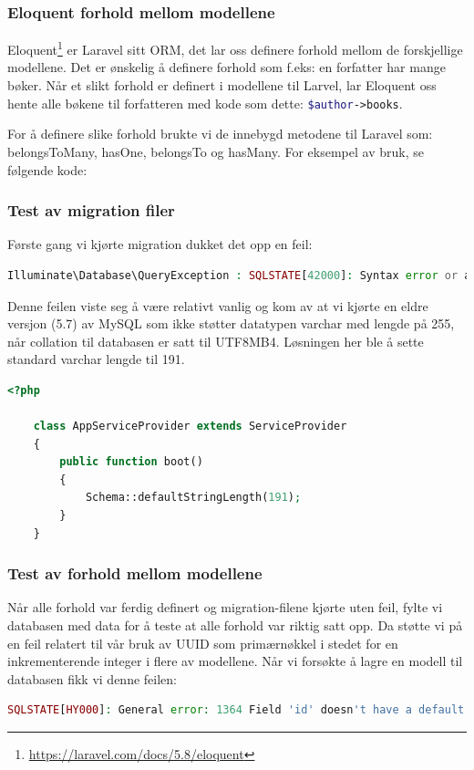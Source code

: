 \subsubsection{Eloquent forhold mellom modellene}
Eloquent\footnote{\url{https://laravel.com/docs/5.8/eloquent}} er Laravel sitt ORM, det lar oss definere forhold mellom de forskjellige modellene. Det er ønskelig å definere forhold som f.eks: en forfatter har mange bøker. Når et slikt forhold er definert i modellene til Larvel, lar Eloquent oss hente alle bøkene til forfatteren med kode som dette: \lstinline[language=PHP]{$author->books}.

For å definere slike forhold brukte vi de innebygd metodene til Laravel som: belongsToMany, hasOne, belongsTo og hasMany. For eksempel av bruk, se følgende kode:


\subsubsection{Test av migration filer}
Første gang vi kjørte migration dukket det opp en feil:
\begin{lstlisting}[caption={Feilmelding i Laravel ved kjøring av migration},language=PHP]
Illuminate\Database\QueryException : SQLSTATE[42000]: Syntax error or access violation: 1071 Specified key was too long; max key length is 767 bytes (SQL: alter table `users` add unique `users_email_unique`(`email`))
\end{lstlisting}
Denne feilen viste seg å være relativt vanlig og kom av at vi kjørte en eldre versjon (5.7) av MySQL som ikke støtter datatypen varchar med lengde på 255, når collation til databasen er satt til UTF8MB4. Løsningen her ble å sette standard varchar lengde til 191.
\begin{lstlisting}[language=PHP, caption={Definering av standard varchar lengde i AppServiceProvider.php}]
    <?php

    class AppServiceProvider extends ServiceProvider
    {
        public function boot()
        {
            Schema::defaultStringLength(191);
        }
    }
\end{lstlisting}

\subsubsection{Test av forhold mellom modellene}
Når alle forhold var ferdig definert og migration-filene kjørte uten feil, fylte vi databasen med data for å teste at alle forhold var riktig satt opp. Da støtte vi på en feil relatert til vår bruk av UUID som primærnøkkel i stedet for en inkrementerende integer i flere av modellene. Når vi forsøkte å lagre en modell til databasen fikk vi denne feilen:
\begin{lstlisting}[language=PHP]
    SQLSTATE[HY000]: General error: 1364 Field 'id' doesn't have a default value ...
\end{lstlisting}


